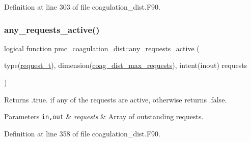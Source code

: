 Definition at line 303 of file coagulation\+\_\+dist.\+F90.

\mbox{\label{namespacepmc__coagulation__dist_a343ec0694b50e82dc5d833f42c9ed359}} 
\subsubsection{\texorpdfstring{any\+\_\+requests\+\_\+active()}{any\_requests\_active()}}
{\footnotesize\ttfamily logical function pmc\+\_\+coagulation\+\_\+dist\+::any\+\_\+requests\+\_\+active (\begin{DoxyParamCaption}\item[{type(\mbox{\hyperlink{structpmc__coagulation__dist_1_1request__t}{request\+\_\+t}}), dimension(\mbox{\hyperlink{namespacepmc__coagulation__dist_ad7130affac816ec06993cec78d709373}{coag\+\_\+dist\+\_\+max\+\_\+requests}}), intent(inout)}]{requests }\end{DoxyParamCaption})}



Returns {\ttfamily }.true. if any of the requests are active, otherwise returns {\ttfamily }.false. 


\begin{DoxyParams}[1]{Parameters}
\mbox{\tt in,out}  & {\em requests} & Array of outstanding requests. \\
\hline
\end{DoxyParams}


Definition at line 358 of file coagulation\+\_\+dist.\+F90.

\mbox{\label{namespacepmc__coagulation__dist_aa22e4e811fa31c5cd6049b4f216ac512}} 
